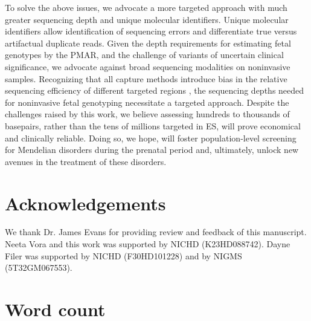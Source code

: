 \documentclass{article}\usepackage[]{graphicx}\usepackage[]{color}
\newcommand\wordcount{}
\begin{document}
To solve the above issues, we advocate a more targeted approach with much greater sequencing depth and unique molecular identifiers.
Unique molecular identifiers allow identification of sequencing errors and differentiate true versus artifactual duplicate reads.
Given the depth requirements for estimating fetal genotypes by the PMAR, and the challenge of variants of uncertain clinical significance, we advocate against broad sequencing modalities on noninvasive samples.
Recognizing that all capture methods introduce bias in the relative sequencing efficiency of different targeted regions \cite{seaby:2016aa}, the sequencing depths needed for noninvasive fetal genotyping necessitate a targeted approach.
Despite the challenges raised by this work, we believe assessing hundreds to thousands of basepairs, rather than the tens of millions targeted in ES, will prove economical and clinically reliable.
Doing so, we hope, will foster population-level screening for Mendelian disorders during the prenatal period and, ultimately, unlock new avenues in the treatment of these disorders.

\nolinenumbers

\section*{Acknowledgements}
We thank Dr. James Evans for providing review and feedback of this manuscript.
Neeta Vora and this work was supported by NICHD (K23HD088742).
Dayne Filer was supported by NICHD (F30HD101228) and by NIGMS (5T32GM067553).




\newpage
\section*{Word count}
\wordcount
\end{document}

